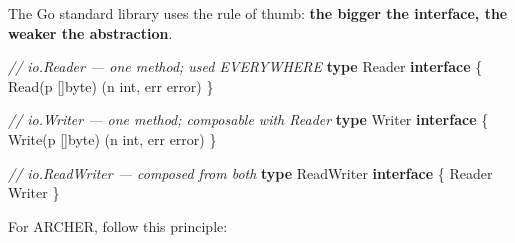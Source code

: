 \documentclass[
]{article}
\newenvironment{Shaded}{}{}
\newcommand{\CommentTok}[1]{\textcolor[rgb]{0.38,0.63,0.69}{\textit{#1}}}
\newcommand{\DataTypeTok}[1]{\textcolor[rgb]{0.56,0.13,0.00}{#1}}
\newcommand{\KeywordTok}[1]{\textcolor[rgb]{0.00,0.44,0.13}{\textbf{#1}}}
\newcommand{\NormalTok}[1]{#1}
\newcommand{\OperatorTok}[1]{\textcolor[rgb]{0.40,0.40,0.40}{#1}}
\begin{document}
The Go standard library uses the rule of thumb: \textbf{the bigger the
interface, the weaker the abstraction}.

\begin{Shaded}
\begin{Highlighting}[]
\CommentTok{// io.Reader — one method; used EVERYWHERE}
\KeywordTok{type}\NormalTok{ Reader }\KeywordTok{interface} \OperatorTok{\{}
\NormalTok{    Read}\OperatorTok{(}\NormalTok{p }\OperatorTok{[]}\DataTypeTok{byte}\OperatorTok{)} \OperatorTok{(}\NormalTok{n }\DataTypeTok{int}\OperatorTok{,}\NormalTok{ err }\DataTypeTok{error}\OperatorTok{)}
\OperatorTok{\}}

\CommentTok{// io.Writer — one method; composable with Reader}
\KeywordTok{type}\NormalTok{ Writer }\KeywordTok{interface} \OperatorTok{\{}
\NormalTok{    Write}\OperatorTok{(}\NormalTok{p }\OperatorTok{[]}\DataTypeTok{byte}\OperatorTok{)} \OperatorTok{(}\NormalTok{n }\DataTypeTok{int}\OperatorTok{,}\NormalTok{ err }\DataTypeTok{error}\OperatorTok{)}
\OperatorTok{\}}

\CommentTok{// io.ReadWriter — composed from both}
\KeywordTok{type}\NormalTok{ ReadWriter }\KeywordTok{interface} \OperatorTok{\{}
\NormalTok{    Reader}
\NormalTok{    Writer}
\OperatorTok{\}}
\end{Highlighting}
\end{Shaded}

For ARCHER, follow this principle:
\end{document}
